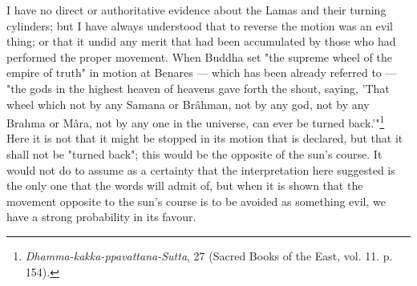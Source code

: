 \documentclass[a4paper, 11pt, oneside, polutonikogreek, english]{article}
\begin{document}
I have no direct or authoritative evidence about the Lamas and their turning cylinders; but I have always understood that to reverse the motion was an evil thing; or that it undid any merit that had been accumulated by those who had performed the proper movement. When Buddha set "the supreme wheel of the empire of truth" in motion at Benares --- which has been already referred to --- "the gods in the highest heaven of heavens gave forth the shout, saying, 'That wheel which not by any Samana or Brâhman, not by any god, not by any Brahma or Mâra, not by any one in the universe, can ever be turned back.'"\footnote{\emph{Dhamma-kakka-ppavattana-Sutta}, 27 (Sacred Books of the East, vol. 11. p. 154).} Here it is not that it might be stopped in its motion that is declared, but that it shall not be "turned back"; this would be the opposite of the sun's course. It would not do to assume as a certainty that the interpretation here suggested is the only one that the words will admit of, but when it is shown that the movement opposite to the sun's course is to be avoided as something evil, we have a strong probability in its favour.
\end{document}
